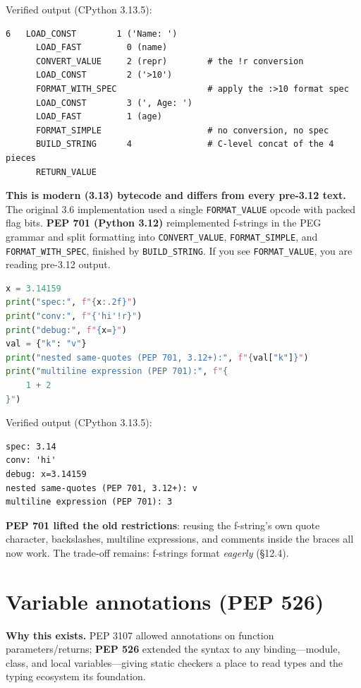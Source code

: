 Verified output (CPython 3.13.5):

\begin{lstlisting}[caption={Output}]
  6   LOAD_CONST        1 ('Name: ')
      LOAD_FAST         0 (name)
      CONVERT_VALUE     2 (repr)        # the !r conversion
      LOAD_CONST        2 ('>10')
      FORMAT_WITH_SPEC                  # apply the :>10 format spec
      LOAD_CONST        3 (', Age: ')
      LOAD_FAST         1 (age)
      FORMAT_SIMPLE                     # no conversion, no spec
      BUILD_STRING      4               # C-level concat of the 4 pieces
      RETURN_VALUE
\end{lstlisting}

\textbf{This is modern (3.13) bytecode and differs from every pre-3.12 text.} The original 3.6
implementation used a single \texttt{FORMAT\_VALUE} opcode with packed flag bits. \textbf{PEP 701
(Python 3.12)} reimplemented f-strings in the PEG grammar and split formatting into
\texttt{CONVERT\_VALUE}, \texttt{FORMAT\_SIMPLE}, and \texttt{FORMAT\_WITH\_SPEC}, finished by
\texttt{BUILD\_STRING}. If you see \texttt{FORMAT\_VALUE}, you are reading pre-3.12 output.

\begin{lstlisting}[language=Python, caption={Format specs, conversions, the = debug form, and PEP 701 relaxations.}]
x = 3.14159
print("spec:", f"{x:.2f}")
print("conv:", f"{'hi'!r}")
print("debug:", f"{x=}")
val = {"k": "v"}
print("nested same-quotes (PEP 701, 3.12+):", f"{val["k"]}")
print("multiline expression (PEP 701):", f"{
    1 + 2
}")
\end{lstlisting}

Verified output (CPython 3.13.5):

\begin{lstlisting}[caption={Output}]
spec: 3.14
conv: 'hi'
debug: x=3.14159
nested same-quotes (PEP 701, 3.12+): v
multiline expression (PEP 701): 3
\end{lstlisting}

\textbf{PEP 701 lifted the old restrictions}: reusing the f-string's own quote character,
backslashes, multiline expressions, and comments inside the braces all now work. The trade-off
remains: f-strings format \emph{eagerly} (§12.4).

\section{Variable annotations (PEP 526)}

\textbf{Why this exists.} PEP 3107 allowed annotations on function parameters/returns; \textbf{PEP
526} extended the syntax to any binding---module, class, and local variables---giving static
checkers a place to read types and the typing ecosystem its foundation.

